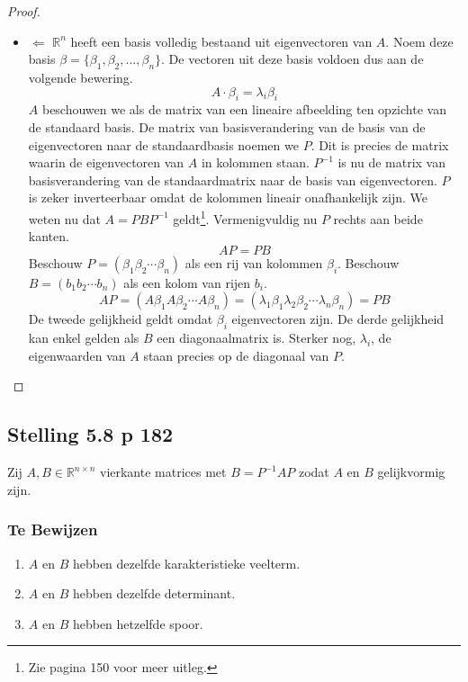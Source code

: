 \documentclass[lineaire_algebra_oplossingen.tex]{subfiles}
\begin{document}
\begin{proof}
\begin{itemize}
\item $\Leftarrow$
$\mathbb{R}^n$ heeft een basis volledig bestaand uit eigenvectoren van $A$. Noem deze basis $\beta = \{\beta_1,\beta_2,...,\beta_n\}$. De vectoren uit deze basis voldoen dus aan de volgende bewering.
\[
A\cdot \beta_i = \lambda_i\beta_i
\]
$A$ beschouwen we als de matrix van een lineaire afbeelding ten opzichte van de standaard basis.
De matrix van basisverandering van de basis van de eigenvectoren naar de standaardbasis noemen we $P$. Dit is precies de matrix waarin de eigenvectoren van $A$ in kolommen staan.
$P^{-1}$ is nu de matrix van basisverandering van de standaardmatrix naar de basis van eigenvectoren. $P$ is zeker inverteerbaar omdat de kolommen lineair onafhankelijk zijn. We weten nu dat $A = PBP^{-1}$ geldt\footnote{Zie pagina 150 voor meer uitleg.}. Vermenigvuldig nu $P$ rechts aan beide kanten.
\[
AP = PB
\]
Beschouw $P = (\beta_1 \beta_2 \cdots \beta _n)$ als een rij van kolommen $\beta_i$. Beschouw $B = (b_1 b_2 \cdots b_n)$ als een kolom van rijen $b_i$.
\[
AP = (A\beta_1 A\beta_2 \cdots A\beta_n) = (\lambda_1\beta_1 \lambda_2\beta_2 \cdots \lambda_n\beta_n) = PB
\]
De tweede gelijkheid geldt omdat $\beta_i$ eigenvectoren zijn.
De derde gelijkheid kan enkel gelden als $B$ een diagonaalmatrix is. Sterker nog, $\lambda_i$, de eigenwaarden van $A$ staan precies op de diagonaal van $P$.

\end{itemize}
\end{proof}

\subsection{Stelling 5.8 p 182}
Zij $A,B \in \mathbb{R}^{n\times n}$ vierkante matrices met $B = P^{-1}AP$ zodat $A$ en $B$ gelijkvormig zijn.
\subsubsection*{Te Bewijzen}
\begin{enumerate}
\item $A$ en $B$ hebben dezelfde karakteristieke veelterm.
\item $A$ en $B$ hebben dezelfde determinant.
\item $A$ en $B$ hebben hetzelfde spoor.
\end{enumerate}
\end{document}
